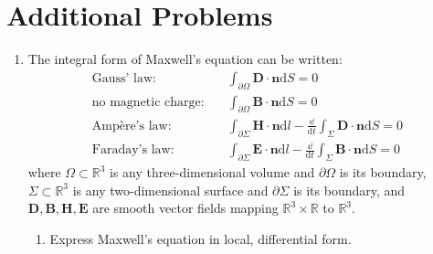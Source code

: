 \documentclass[a4paper,12pt]{article}
\newcommand{\reals}{\mathbb{R}}
\newcommand{\dd}[1]{\mathrm{d}#1}
\begin{document}
\section*{Additional Problems}
\begin{enumerate}[label = \arabic*.]
	\item The integral form of Maxwell's equation can be written:
	\begin{align}
		\text{Gauss' law:}&\quad \int_{\partial \Omega} \textbf{D}\cdot \textbf{n} \dd S = 0 \label{equ:gauss} \\
		\text{no magnetic charge:}&\quad \int_{\partial\Omega} \textbf{B} \cdot \textbf{n} \dd S = 0 \label{equ:charge} \\
		\text{Amp\`ere's law:}&\quad \int_{\partial \Sigma} \textbf{H} \cdot \textbf{n} \dd l - \frac{\dd}{\dd t} \int_\Sigma \textbf{D} \cdot \textbf{n} \dd S = 0 \label{equ:amps} \\
		\text{Faraday's law:}&\quad \int_{\partial \Sigma} \textbf{E} \cdot \textbf{n} \dd l - \frac{\dd}{\dd t} \int_\Sigma \textbf{B} \cdot \textbf{n} \dd S = 0 \label{equ:faraday}
	\end{align}
	where $ \Omega \subset \reals^3 $ is any three-dimensional volume and $ \partial \Omega $ is its boundary, $ \Sigma \subset \reals^3 $ is any two-dimensional surface and $ \partial \Sigma $ is its boundary, and $ \textbf{D}, \textbf{B}, \textbf{H}, \textbf{E} $ are smooth vector fields mapping $ \reals^3 \times \reals $ to $ \reals^3 $.
	\begin{enumerate}[label = (\alph*)]
		\item Express Maxwell's equation in local, differential form.
		

\end{enumerate}
\end{enumerate}
\end{document}
